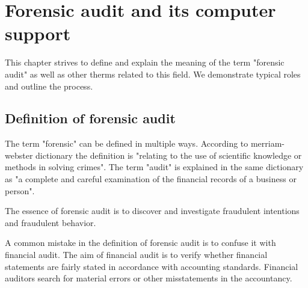\chapter{Forensic audit and its computer support}




This chapter strives to define and explain the meaning of the term "forensic audit" as well as other therms related to this field. We demonstrate typical roles and outline the process.


\section{Definition of forensic audit}\label{FA_definition}
The term "forensic" can be defined in multiple ways. According to merriam-webster dictionary  the definition is "relating to the use of scientific knowledge or methods in solving crimes". The term "audit" is explained in the same dictionary as "a complete and careful examination of the financial records of a business or person". 

The essence of forensic audit is to discover and investigate fraudulent intentions and fraudulent behavior. 

A common mistake in the definition of forensic audit is to confuse it with financial audit. The aim of financial audit is to verify whether financial statements are fairly stated in accordance with accounting standards. Financial auditors search for material errors or other misstatements in the accountancy.

